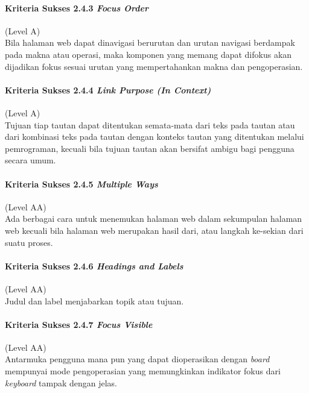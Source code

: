 \paragraph{Kriteria Sukses 2.4.3 \textit{Focus Order}}
\label{sec:kriteria_sukses_2.4.3}
(Level A)\\

Bila halaman web dapat dinavigasi berurutan dan urutan navigasi berdampak pada makna atau operasi, maka komponen yang memang dapat difokus akan dijadikan fokus sesuai urutan yang mempertahankan makna dan pengoperasian.

\paragraph{Kriteria Sukses 2.4.4 \textit{Link Purpose (In Context)}}
\label{sec:kriteria_sukses_2.4.4}
(Level A)\\

Tujuan tiap tautan dapat ditentukan semata-mata dari teks pada tautan atau dari kombinasi teks pada tautan dengan konteks tautan yang ditentukan melalui pemrograman, kecuali bila tujuan tautan akan bersifat ambigu bagi pengguna secara umum.

\paragraph{Kriteria Sukses 2.4.5 \textit{Multiple Ways}}
\label{sec:kriteria_sukses_2.4.5}
(Level AA)\\

Ada berbagai cara untuk menemukan halaman web dalam sekumpulan halaman web kecuali bila halaman web merupakan hasil dari, atau langkah ke-sekian dari suatu proses.

\paragraph{Kriteria Sukses 2.4.6 \textit{Headings and Labels}}
\label{sec:kriteria_sukses_2.4.6}
(Level AA)\\
Judul dan label menjabarkan topik atau tujuan.

\paragraph{Kriteria Sukses 2.4.7 \textit{Focus Visible}}
\label{sec:kriteria_sukses_2.4.7}
(Level AA)\\

Antarmuka pengguna mana pun yang dapat dioperasikan dengan \textit{board} mempunyai mode pengoperasian yang memungkinkan indikator fokus dari \textit{keyboard} tampak dengan jelas.

